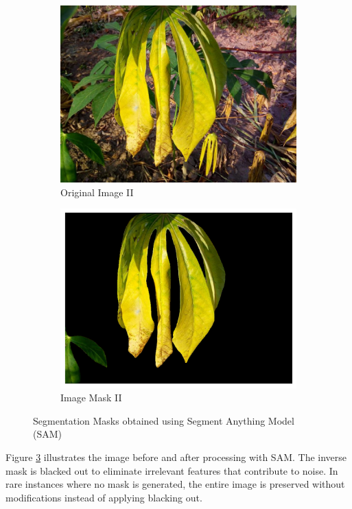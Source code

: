\begin{figure}[t]
\begin{subfigure}[b]{0.22\linewidth}
        \centering
        \includegraphics[width=\linewidth]{graphs/samraw2.jpg}
        \caption{Original Image II}
        \label{fig:Original Image (2)}
    \end{subfigure}
     \hfill
     \begin{subfigure}[b]{0.22\linewidth}
        \centering
        \includegraphics[width=\linewidth]{graphs/sam2.png}
        \caption{Image Mask II}
        \label{fig:Segmentation mask (2)}
    \end{subfigure}
    \caption{Segmentation Masks obtained using Segment Anything Model (SAM)}
    \label{fig:four_images}
\end{figure}

Figure \ref{fig:four_images} illustrates the image before and after processing with SAM. The inverse mask is blacked out to eliminate irrelevant features that contribute to noise. In rare instances where no mask is generated, the entire image is preserved without modifications instead of applying blacking out.
